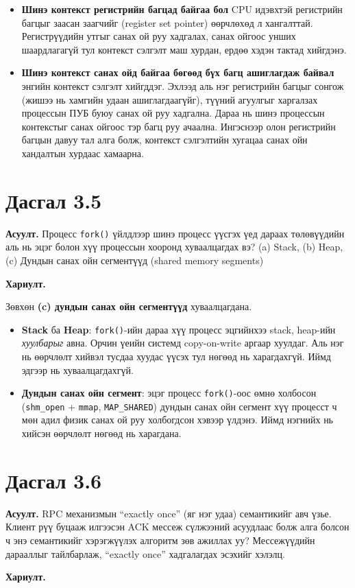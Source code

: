 \documentclass[12pt,a4paper]{article}
\newcommand{\question}[2]{\section{Дасгал #1}\textbf{Асуулт.} #2\par\medskip\textbf{Хариулт.}\par}
\begin{document}
\begin{itemize}[leftmargin=1.5em]
  \item \textbf{Шинэ контекст регистрийн багцад байгаа бол} CPU идэвхтэй регистрийн багцыг заасан заагчийг (register set pointer) өөрчлөхөд л хангалттай. Регистрүүдийн утгыг санах ой руу хадгалах, санах ойгоос унших шаардлагагүй тул контекст сэлгэлт маш хурдан, ердөө хэдэн тактад хийгдэнэ.
  \item \textbf{Шинэ контекст санах ойд байгаа бөгөөд бүх багц ашиглагдаж байвал} энгийн контекст сэлгэлт хийгддэг. Эхлээд аль нэг регистрийн багцыг сонгож (жишээ нь хамгийн удаан ашиглагдаагүйг), түүний агуулгыг харгалзах процессын ПУБ буюу санах ой руу хадгална. Дараа нь шинэ процессын контекстыг санах ойгоос тэр багц руу ачаална. Ингэснээр олон регистрийн багцын давуу тал алга болж, контекст сэлгэлтийн хугацаа санах ойн хандалтын хурдаас хамаарна.
\end{itemize}

\question{3.5}{Процесс \texttt{fork()} үйлдлээр шинэ процесс үүсгэх үед дараах төлөвүүдийн аль нь эцэг болон хүү процессын хооронд хуваалцагдах вэ? (a) Stack, (b) Heap, (c) Дундын санах ойн сегментүүд (shared memory segments)}

Зөвхөн \textbf{(c) дундын санах ойн сегментүүд} хуваалцагдана.

\begin{itemize}[leftmargin=1.5em]
  \item \textbf{Stack} ба \textbf{Heap}: \texttt{fork()}-ийн дараа хүү процесс эцгийнхээ stack, heap-ийн \emph{хуулбарыг} авна. Орчин үеийн системд copy-on-write аргаар хуулдаг. Аль нэг нь өөрчлөлт хийвэл тусдаа хуудас үүсэх тул нөгөөд нь харагдахгүй. Иймд эдгээр нь хуваалцагдахгүй.
  \item \textbf{Дундын санах ойн сегмент}: эцэг процесс \texttt{fork()}-оос өмнө холбосон (\texttt{shm\_open} + \texttt{mmap}, \texttt{MAP\_SHARED}) дундын санах ойн сегмент хүү процесст ч мөн адил физик санах ой руу холбогдсон хэвээр үлдэнэ. Иймд нэгнийх нь хийсэн өөрчлөлт нөгөөд нь харагдана.
\end{itemize}

\question{3.6}{RPC механизмын “exactly once” (яг нэг удаа) семантикийг авч үзье. Клиент рүү буцааж илгээсэн ACK мессеж сүлжээний асуудлаас болж алга болсон ч энэ семантикийг хэрэгжүүлэх алгоритм зөв ажиллах уу? Мессежүүдийн дарааллыг тайлбарлаж, “exactly once” хадгалагдах эсэхийг хэлэлц.}
\end{document}
